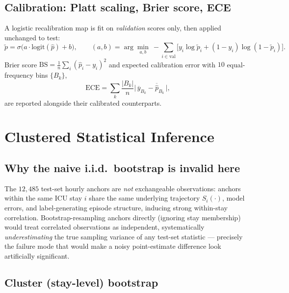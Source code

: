 \documentclass[11pt]{article}
\newcommand{\1}[1]{\mathbf{1}\!\left[#1\right]}
\begin{document}
\subsection{Calibration: Platt scaling, Brier score, ECE}

A logistic recalibration map is fit on \emph{validation} scores only, then applied unchanged to test:
\begin{equation}
\tilde p = \sigma\big(a\cdot\mathrm{logit}(\hat p) + b\big), \qquad (a,b) = \arg\min_{a,b} \ -\sum_{i\in\mathrm{val}} \big[y_i\log\tilde p_i + (1-y_i)\log(1-\tilde p_i)\big].
\end{equation}
Brier score $\mathrm{BS}=\tfrac1n\sum_i(\hat p_i-y_i)^2$ and expected calibration error with $10$ equal-frequency bins $\{B_k\}$,
\begin{equation}
\mathrm{ECE} = \sum_k \frac{|B_k|}{n}\Big|\, \overline{y}_{B_k} - \overline{\hat p}_{B_k}\,\Big|,
\end{equation}
are reported alongside their calibrated counterparts.

\section{Clustered Statistical Inference}\label{sec:bootstrap}

\subsection{Why the naive i.i.d.\ bootstrap is invalid here}

The $12{,}485$ test-set hourly anchors are \emph{not} exchangeable observations: anchors within the same ICU stay $i$ share the same underlying trajectory $S_i(\cdot)$, model errors, and label-generating episode structure, inducing strong within-stay correlation. Bootstrap-resampling anchors directly (ignoring stay membership) would treat correlated observations as independent, systematically \emph{underestimating} the true sampling variance of any test-set statistic — precisely the failure mode that would make a noisy point-estimate difference look artificially significant.

\subsection{Cluster (stay-level) bootstrap}
\end{document}
